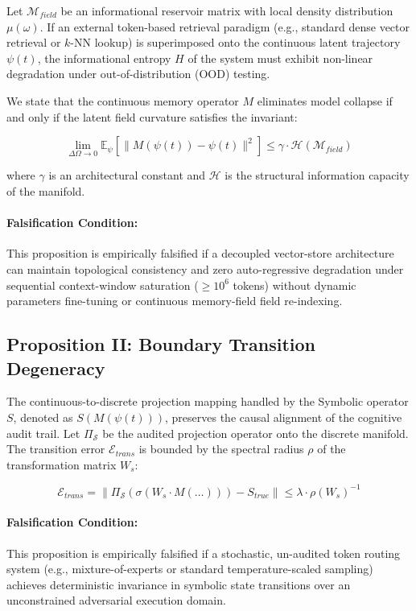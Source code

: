 Let $\mathcal{M}_{field}$ be an informational reservoir matrix with local density distribution $\mu(\omega)$. If an external token-based retrieval paradigm (e.g., standard dense vector retrieval or $k$-NN lookup) is superimposed onto the continuous latent trajectory $\psi(t)$, the informational entropy $H$ of the system must exhibit non-linear degradation under out-of-distribution (OOD) testing.

We state that the continuous memory operator $M$ eliminates model collapse if and only if the latent field curvature satisfies the invariant:

\begin{equation}
\lim_{\Delta \Omega \to 0} \mathbb{E}_{\psi} \left[ \| M(\psi(t)) - \psi(t) \|^2 \right] \le \gamma \cdot \mathcal{H}(\mathcal{M}_{field})
\end{equation}

where $\gamma$ is an architectural constant and $\mathcal{H}$ is the structural information capacity of the manifold. 
\paragraph{Falsification Condition:} This proposition is empirically falsified if a decoupled vector-store architecture can maintain topological consistency and zero auto-regressive degradation under sequential context-window saturation ($\ge 10^6$ tokens) without dynamic parameters fine-tuning or continuous memory-field field re-indexing.

\subsection{Proposition II: Boundary Transition Degeneracy}

The continuous-to-discrete projection mapping handled by the Symbolic operator $S$, denoted as $S(M(\psi(t)))$, preserves the causal alignment of the cognitive audit trail. Let $\Pi_{\mathcal{S}}$ be the audited projection operator onto the discrete manifold. The transition error $\mathcal{E}_{trans}$ is bounded by the spectral radius $\rho$ of the transformation matrix $W_s$:

\begin{equation}
\mathcal{E}_{trans} = \| \Pi_{\mathcal{S}} ( \sigma (W_s \cdot M(\dots) ) ) - S_{true} \| \le \lambda \cdot \rho(W_s)^{-1}
\end{equation}

\paragraph{Falsification Condition:} This proposition is empirically falsified if a stochastic, un-audited token routing system (e.g., mixture-of-experts or standard temperature-scaled sampling) achieves deterministic invariance in symbolic state transitions over an unconstrained adversarial execution domain.

